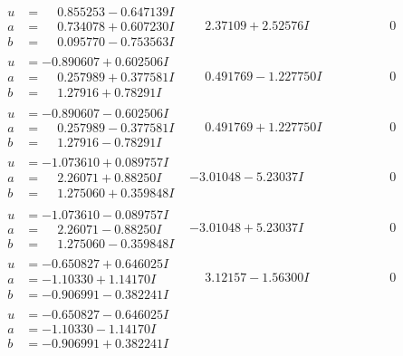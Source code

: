\documentclass[1p]{elsarticle_modified}
\theoremstyle{definition}
\begin{document}
$$\begin{array}{c|c|c}
\begin{aligned}
u &= \phantom{-}0.855253 - 0.647139 I \\
a &= \phantom{-}0.734078 + 0.607230 I \\
b &= \phantom{-}0.095770 - 0.753563 I\end{aligned}
 & \phantom{-}2.37109 + 2.52576 I & \phantom{-0.000000 } 0 \\ \hline\begin{aligned}
u &= -0.890607 + 0.602506 I \\
a &= \phantom{-}0.257989 + 0.377581 I \\
b &= \phantom{-}1.27916 + 0.78291 I\end{aligned}
 & \phantom{-}0.491769 - 1.227750 I & \phantom{-0.000000 } 0 \\ \hline\begin{aligned}
u &= -0.890607 - 0.602506 I \\
a &= \phantom{-}0.257989 - 0.377581 I \\
b &= \phantom{-}1.27916 - 0.78291 I\end{aligned}
 & \phantom{-}0.491769 + 1.227750 I & \phantom{-0.000000 } 0 \\ \hline\begin{aligned}
u &= -1.073610 + 0.089757 I \\
a &= \phantom{-}2.26071 + 0.88250 I \\
b &= \phantom{-}1.275060 + 0.359848 I\end{aligned}
 & -3.01048 - 5.23037 I & \phantom{-0.000000 } 0 \\ \hline\begin{aligned}
u &= -1.073610 - 0.089757 I \\
a &= \phantom{-}2.26071 - 0.88250 I \\
b &= \phantom{-}1.275060 - 0.359848 I\end{aligned}
 & -3.01048 + 5.23037 I & \phantom{-0.000000 } 0 \\ \hline\begin{aligned}
u &= -0.650827 + 0.646025 I \\
a &= -1.10330 + 1.14170 I \\
b &= -0.906991 - 0.382241 I\end{aligned}
 & \phantom{-}3.12157 - 1.56300 I & \phantom{-0.000000 } 0 \\ \hline\begin{aligned}
u &= -0.650827 - 0.646025 I \\
a &= -1.10330 - 1.14170 I \\
b &= -0.906991 + 0.382241 I\end{aligned}

\end{array}$$
\end{document}
